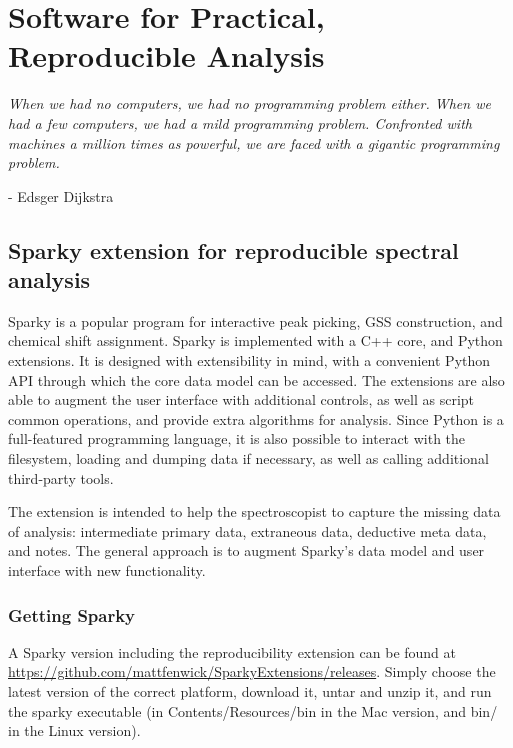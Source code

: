 \chapter{Software for Practical, Reproducible Analysis}

\begin{center}
  \textit{When we had no computers, we had no programming problem either. 
    When we had a few computers, we had a mild programming problem. Confronted 
    with machines a million times as powerful, we are faced with a gigantic 
    programming problem.}

 - Edsger Dijkstra
\end{center}

\section{Sparky extension for reproducible spectral analysis}
\label{sec_sparky_extension}

Sparky \cite{sparky} is a popular program for interactive peak picking,
GSS construction, and chemical shift assignment.  Sparky is implemented 
with a C++ core, and Python extensions.  It is designed with
extensibility in mind, with a convenient Python API through which 
the core data model can be accessed.  The
extensions are also able to augment the user interface with additional
controls, as well as script common operations, and provide extra algorithms
for analysis.  Since Python is a full-featured programming language, 
it is also possible to interact with the filesystem, loading and dumping
data if necessary, as well as calling additional third-party tools.

The extension is intended to help the spectroscopist to capture the 
missing data of analysis: intermediate primary data, extraneous
data, deductive meta data, and notes.  The general approach is to augment
Sparky's data model and user interface with new functionality.

\subsection{Getting Sparky}
A Sparky version including the reproducibility extension can be found at
\url{https://github.com/mattfenwick/SparkyExtensions/releases}.  Simply 
choose the latest version of the correct platform, download it, untar and 
unzip it, and run the sparky executable (in Contents/Resources/bin in the
Mac version, and bin/ in the Linux version).

